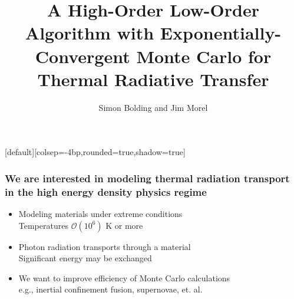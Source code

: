 \documentclass[xcolor=dvipsnames,hyperref={pdfpagelabels=false},unknownkeysallowed]{beamer}
\title[HOLO for TRT]{A High-Order Low-Order Algorithm with Exponentially-Convergent Monte Carlo for
    Thermal Radiative Transfer}
\author[S.R. Bolding]{{Simon Bolding and Jim Morel}}
\date{\vspace{-0.1in}{22 November 2016} }
\newcommand{\colb}[1]{{\color{blue} #1}}
\newcommand{\colG}[1]{{\color{Gray!110} #1}}
\newlength{\wideitemsep}
\let\olditem\item
\renewcommand{\item}{\setlength{\itemsep}{\wideitemsep}\olditem}
\begin{document}
[default][colsep=-4bp,rounded=true,shadow=true]

\def\beginpage{\null\vfill\bgroup
\offinterlineskip\leftskip=\z@}
\def\endpage{\egroup\eject}

\begin{frame}
    \titlepage \vspace{-0.213in}
    \begin{center}
    \end{center}    
\end{frame}

\setlength{\tabcolsep}{6pt}



\begin{frame}
\frametitle{We are interested in modeling thermal radiation transport \\ in the high energy
    density physics regime}
{\addtolength{\leftmargini}{-0.2in}
    \addtolength{\wideitemsep}{0.08in}
\begin{itemize}
    \item[] Modeling materials under extreme conditions \\ \colG{Temperatures $\mathcal{O}(10^6)$ K or more}
    \item[] Photon radiation transports through a material \\ 
        \colG{Significant \colb{energy}  may be exchanged}
 \item[] We want to improve efficiency of Monte Carlo calculations \\
     \colG{e.g., inertial confinement fusion, supernovae, et. al.}
    \end{itemize}}
\end{frame}
\end{document}

